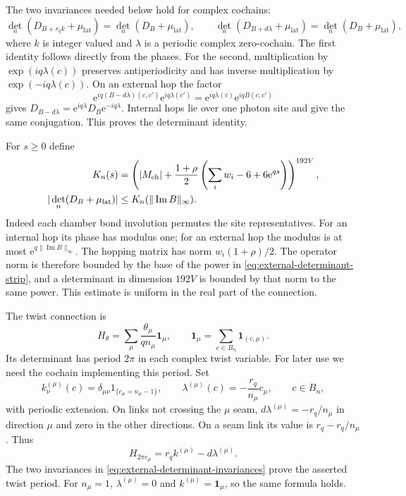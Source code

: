 \documentclass[11pt,letterpaper,reqno]{amsart}
\begin{document}
The two invariances needed below hold for complex cochains:
\begin{equation}\label{eq:external-determinant-invariances}
 \det_n(D_{B+r_qk}+\mu_{\mathrm{lat}})
       =\det_n(D_B+\mu_{\mathrm{lat}}),\qquad
 \det_n(D_{B+d\lambda}+\mu_{\mathrm{lat}})
       =\det_n(D_B+\mu_{\mathrm{lat}}),
\end{equation}
where $k$ is integer valued and $\lambda$ is a periodic complex
zero-cochain. The first identity follows directly from the phases.
For the second, multiplication by $\exp(iq\lambda(c))$ preserves
antiperiodicity and has inverse multiplication by
$\exp(-iq\lambda(c))$. On an external hop the factor
\[
 \mathrm e^{iq(B-d\lambda)(c,c')}\mathrm e^{iq\lambda(c')}
                                  =\mathrm e^{iq\lambda(c)}\mathrm e^{iqB(c,c')}
\]
gives $D_{B-d\lambda}=\mathrm e^{iq\lambda}D_B\mathrm e^{-iq\lambda}$.
Internal hops lie over one photon site and give the same
conjugation. This proves the determinant identity.

For $s\ge0$ define
\begin{align}
 K_n(s)&=
 \left(|M_{\mathrm{ch}}|+\frac{1+\rho}{2}
           \left(\sum_iw_i-6+6\mathrm e^{qs}\right)\right)^{192V},
           \notag\\
 |\det_n(D_B+\mu_{\mathrm{lat}})|
                   &\le K_n(\|\operatorname{Im}B\|_\infty).
                   \label{eq:external-determinant-strip}
\end{align}
Indeed each chamber bond involution permutes the site representatives.
For an internal hop its phase has modulus one; for an external
hop the modulus is at most $\mathrm e^{q\|\operatorname{Im}B\|_\infty}$.
The hopping matrix has norm $w_i(1+\rho)/2$. The operator norm
is therefore bounded by the base of the power in
\eqref{eq:external-determinant-strip}, and a determinant in dimension
$192V$ is bounded by that norm to the same power.
This estimate is uniform in the real part of the connection.

The twist connection is
\begin{equation}\label{eq:external-twist}
 H_\theta=\sum_\mu\frac{\theta_\mu}{qn_\mu}\mathbf1_\mu,
 \qquad
 \mathbf1_\mu=\sum_{c\in B_n}\mathbf1_{(c,\mu)}.
\end{equation}
Its determinant has period $2\pi$ in each complex twist variable.
For later use we need the cochain implementing this period. Set
\[
 k^{(\mu)}_\nu(c)=\delta_{\mu\nu}1_{\{c_\mu=n_\mu-1\}},
 \qquad
 \lambda^{(\mu)}(c)=-\frac{r_q}{n_\mu}c_\mu,\qquad c\in B_n,
\]
with periodic extension. On links not crossing the $\mu$ seam,
$d\lambda^{(\mu)}=-r_q/n_\mu$ in direction $\mu$ and zero
in the other directions. On a seam link its value is
$r_q-r_q/n_\mu$. Thus
\begin{equation}\label{eq:external-twist-period}
 H_{2\pi e_\mu}=r_qk^{(\mu)}-d\lambda^{(\mu)}.
\end{equation}
The two invariances in
\eqref{eq:external-determinant-invariances} prove the asserted
twist period. For $n_\mu=1$, $\lambda^{(\mu)}=0$ and
$k^{(\mu)}=\mathbf1_\mu$, so the same formula holds.
\end{document}
